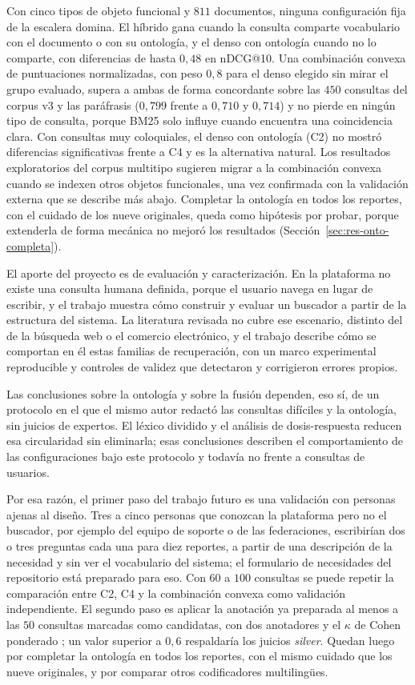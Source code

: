 \documentclass[11pt,letterpaper]{article}
\numberwithin{equation}{section}
\begin{document}
Con cinco tipos de objeto funcional y $811$ documentos, ninguna configuración fija de la escalera domina. El híbrido gana cuando la consulta comparte vocabulario con el documento o con su ontología, y el denso con ontología cuando no lo comparte, con diferencias de hasta $0{,}48$ en nDCG@10. Una combinación convexa de puntuaciones normalizadas, con peso $0{,}8$ para el denso elegido sin mirar el grupo evaluado, supera a ambas de forma concordante sobre las $450$ consultas del corpus v3 y las paráfrasis ($0{,}799$ frente a $0{,}710$ y $0{,}714$) y no pierde en ningún tipo de consulta, porque BM25 solo influye cuando encuentra una coincidencia clara. Con consultas muy coloquiales, el denso con ontología (C2) no mostró diferencias significativas frente a C4 y es la alternativa natural. Los resultados exploratorios del corpus multitipo sugieren migrar a la combinación convexa cuando se indexen otros objetos funcionales, una vez confirmada con la validación externa que se describe más abajo. Completar la ontología en todos los reportes, con el cuidado de los nueve originales, queda como hipótesis por probar, porque extenderla de forma mecánica no mejoró los resultados (Sección~\ref{sec:res-onto-completa}).

El aporte del proyecto es de evaluación y caracterización. En la plataforma no existe una consulta humana definida, porque el usuario navega en lugar de escribir, y el trabajo muestra cómo construir y evaluar un buscador a partir de la estructura del sistema. La literatura revisada no cubre ese escenario, distinto del de la búsqueda web o el comercio electrónico, y el trabajo describe cómo se comportan en él estas familias de recuperación, con un marco experimental reproducible y controles de validez que detectaron y corrigieron errores propios.

Las conclusiones sobre la ontología y sobre la fusión dependen, eso sí, de un protocolo en el que el mismo autor redactó las consultas difíciles y la ontología, sin juicios de expertos. El léxico dividido y el análisis de dosis-respuesta reducen esa circularidad sin eliminarla; esas conclusiones describen el comportamiento de las configuraciones bajo este protocolo y todavía no frente a consultas de usuarios.

Por esa razón, el primer paso del trabajo futuro es una validación con personas ajenas al diseño. Tres a cinco personas que conozcan la plataforma pero no el buscador, por ejemplo del equipo de soporte o de las federaciones, escribirían dos o tres preguntas cada una para diez reportes, a partir de una descripción de la necesidad y sin ver el vocabulario del sistema; el formulario de necesidades del repositorio está preparado para eso. Con $60$ a $100$ consultas se puede repetir la comparación entre C2, C4 y la combinación convexa como validación independiente. El segundo paso es aplicar la anotación ya preparada al menos a las $50$ consultas marcadas como candidatas, con dos anotadores y el $\kappa$ de Cohen ponderado \cite{cohen1968weighted}; un valor superior a $0{,}6$ respaldaría los juicios \textit{silver}. Quedan luego por completar la ontología en todos los reportes, con el mismo cuidado que los nueve originales, y por comparar otros codificadores multilingües.
\end{document}
